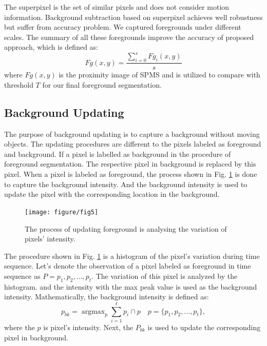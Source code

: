\documentclass[runningheads,a4paper]{llncs}
\newcommand{\reffig}[1]{Fig. \ref{#1}}
\DeclareMathOperator*{\argmax}{argmax}
\begin{document}
The superpixel is the set of similar pixels and does not consider motion
information. Background subtraction based on superpixel achieves well
robustness but suffer from accuracy problem. We captured foregrounds
under different scales. The summary of all these foregrounds improve the
accuracy of proposed approach, which is defined as:
\begin{equation}
    Fg(x,y) = \frac{ \sum\limits_{i = 0}^{s}Fg_i(x,y)}{s}
\end{equation}
where $Fg(x,y)$ is the proximity image of SPMS and is utilized to compare
with threshold $T$ for our final foreground segmentation.

\subsection{Background Updating}
\label{model_update}
The purpose of background updating is to capture a background without
moving objects.
The updating procedures are different to the pixels labeled as foreground and background.
%
If a pixel is labelled as background in the procedure of foreground segmentation.
%
The respective pixel in background is replaced by this pixel.
%
When a pixel is labeled as foreground, the process shown in
\reffig{fig_bkupdate} is done to capture the background intensity.
%
And the background intensity is used to update the pixel with the corresponding
location in the background.
\begin{figure}
    \centering
    \texttt{[image: figure/fig5]}
    \caption{The process of updating foreground is analysing the variation of
    pixels' intensity.}
    \label{fig_bkupdate}
\end{figure}

The procedure shown in \reffig{fig_bkupdate} is a histogram of the pixel's
variation during time sequence.
Let's denote the observation of a pixel labeled as foreground in time sequence as $P = {p_1,p_2,\dots,p_t}$.
The variation of this pixel is analyzed by the histogram.
and the intensity with the max peak value is used as the
background intensity. Mathematically, the background intensity is defined as:
\begin{equation}
    p_{bk} = \mathop{\argmax}_{p}{\sum\limits_{i = 1}^{t} p_i \cap p} \quad p = \{p_1,p_2,\dots,p_t\},
\end{equation}
where the $p$ is pixel's intensity. Next, the $P_{bk}$ is used to update the
corresponding pixel in background.
\end{document}
